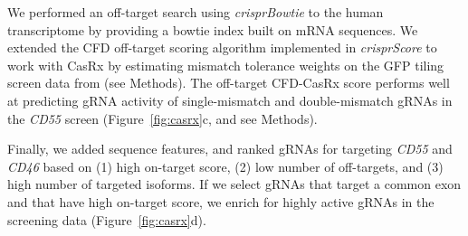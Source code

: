 \documentclass[pdftex,english,10pt]{article}
\begin{document}
We performed an off-target search using \textit{crisprBowtie} to the human transcriptome by providing a bowtie index built on mRNA sequences.
We extended the CFD off-target scoring algorithm implemented in \textit{crisprScore} to work with CasRx by estimating mismatch tolerance weights on the GFP tiling screen data from \citet{wessels2020massively} (see Methods). The off-target CFD-CasRx score performs well at predicting gRNA activity of single-mismatch and double-mismatch gRNAs in the \textit{CD55} screen (Figure~\ref{fig:casrx}c, and see Methods).  

Finally, we added sequence features, and ranked gRNAs for targeting \textit{CD55} and \textit{CD46} based on (1) high on-target score, (2) low number of off-targets, and (3) high number of targeted isoforms. If we select gRNAs that target a common exon and that have high on-target score, we enrich for highly active gRNAs in the screening data (Figure~\ref{fig:casrx}d). 
\end{document}
